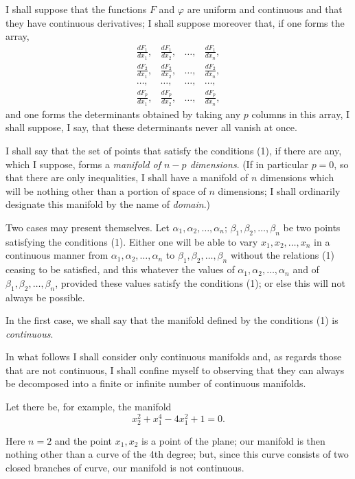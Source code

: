\documentclass{article}
\begin{document}
I shall suppose that the functions $F$ and $\varphi$ are uniform and continuous and that they have continuous derivatives; I shall suppose moreover that, if one forms the array,
\[
\begin{matrix}
\frac{dF_{1}}{dx_{1}}, & \frac{dF_{1}}{dx_{2}}, & \ldots, & \frac{dF_{1}}{dx_{n}},\\[1ex]
\frac{dF_{2}}{dx_{1}}, & \frac{dF_{2}}{dx_{2}}, & \ldots, & \frac{dF_{2}}{dx_{n}},\\[1ex]
\ldots, & \ldots, & \ldots, & \ldots,\\[1ex]
\frac{dF_{p}}{dx_{1}}, & \frac{dF_{p}}{dx_{2}}, & \ldots, & \frac{dF_{p}}{dx_{n}},
\end{matrix}
\]
and one forms the determinants obtained by taking any $p$ columns
in this array, I shall suppose, I say, that these determinants never all vanish at once.

I shall say that the set of points that satisfy the conditions (1), if there are any, which I suppose, forms a \emph{manifold of $n-p$ dimensions}. (If in particular $p = 0$, so that there are only inequalities, I shall have a manifold of $n$ dimensions which will be nothing other than a portion of space of $n$ dimensions; I shall ordinarily designate this manifold by the name of \emph{domain}.)

Two cases may present themselves. Let $\alpha_{1}, \alpha_{2}, \ldots, \alpha_{n}$; $\beta_{1}, \beta_{2}, \ldots, \beta_{n}$ be two points satisfying the conditions (1). Either one will be able to vary $x_{1}, x_{2}, \ldots, x_{n}$ in a continuous manner from $\alpha_{1}, \alpha_{2}, \ldots, \alpha_{n}$ to $\beta_{1}, \beta_{2}, \ldots, \beta_{n}$ without the relations (1) ceasing to be satisfied, and this whatever the values of $\alpha_{1}, \alpha_{2}, \ldots, \alpha_{n}$ and of $\beta_{1}, \beta_{2}, \ldots, \beta_{n}$, provided these values satisfy the conditions (1); or else this will not always be possible.

In the first case, we shall say that the manifold defined by the conditions (1) is \emph{continuous}.

In what follows I shall consider only continuous manifolds and, as regards those that are not continuous, I shall confine myself to observing that they can always be decomposed into a finite or infinite number of continuous manifolds.

Let there be, for example, the manifold
\[
x^{2}_{2} + x^{4}_{1} - 4x^{2}_{1} + 1 = 0.
\]

Here $n = 2$ and the point $x_{1}, x_{2}$ is a point of the plane; our manifold is then nothing other than a curve of the 4th degree; but, since this curve consists of two closed branches of curve, our manifold is not continuous.
\end{document}
